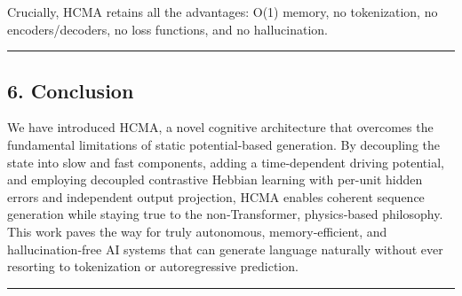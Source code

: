 \documentclass[
  11pt,
  a4paper,
]{article}
\begin{document}
Crucially, HCMA retains all the advantages: O(1) memory, no
tokenization, no encoders/decoders, no loss functions, and no
hallucination.

\begin{center}\rule{0.5\linewidth}{0.5pt}\end{center}

\subsection{6. Conclusion}\label{conclusion}

We have introduced HCMA, a novel cognitive architecture that overcomes
the fundamental limitations of static potential‑based generation. By
decoupling the state into slow and fast components, adding a
time‑dependent driving potential, and employing decoupled contrastive
Hebbian learning with per-unit hidden errors and independent output
projection, HCMA enables coherent sequence generation while staying true
to the non‑Transformer, physics‑based philosophy. This work paves the
way for truly autonomous, memory‑efficient, and hallucination‑free AI
systems that can generate language naturally without ever resorting to
tokenization or autoregressive prediction.

\begin{center}\rule{0.5\linewidth}{0.5pt}\end{center}
\end{document}
